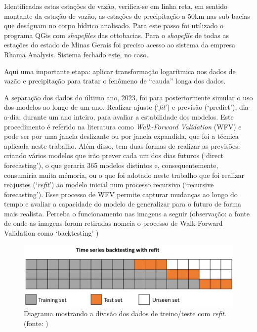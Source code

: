 Identificadas estas estações de vazão, verifica-se em linha reta, em sentido montante da estação de vazão, as estações de precipitação a 50km nas sub-bacias que deságuam no corpo hídrico analisado. Para este passo foi utilizado o programa QGis com \textit{shapefiles} das ottobacias.\cite{snirh_ottobacia_2024} Para o \textit{shapefile} de todas as estações do estado de Minas Gerais foi preciso acesso ao sistema da empresa Rhama Analysis. Sistema fechado este, no caso.


Aqui uma importante etapa: aplicar transformação logarítmica nos dados de vazão e precipitação para tratar o fenômeno de ``cauda'' longa dos dados.

A separação dos dados do último ano, 2023, foi para posteriormente simular o uso dos modelos ao longo de um ano. Realizar ajuste (`\textit{fit}') e previsão (`predict'), dia-a-dia, durante um ano inteiro, para avaliar a estabilidade dos modelos. Este procedimento é referido na literatura como \textit{Walk-Forward Validation} (WFV) e pode ser por uma janela deslizante ou por janela expandida, que foi a técnica aplicada neste trabalho. Além disso, tem duas formas de realizar as previsões: criando vários modelos que irão prever cada um dos dias futuros (`direct forecasting'), o que geraria 365 modelos distintos e, consequentemente, consumiria muita mémoria, ou o que foi adotado neste trabalho que foi realizar reajustes (`\textit{refit}') ao modelo inicial num processo recursivo (`recursive forecasting'). Esse processo de WFV permite capturar mudanças ao longo do tempo e avaliar a capacidade do modelo de generalizar para o futuro de forma mais realista. Perceba o funcionamento nas imagens a seguir (observação: a fonte de onde as imagens foram retiradas nomeia o processo de Walk-Forward Validation como `backtesting' \cite{skforecast})

\begin{figure}[!h]
	\centering
	\includegraphics[scale=0.3]{Figuras/skforecast-diagram-backtesting-refit.png}
	\caption{Diagrama mostrando a divisão dos dados de treino/teste com \textit{refit}.\\(fonte: \cite{skforecast})}
	\label{fig:skforecast-diagram-backtesting-refit}
\end{figure}

